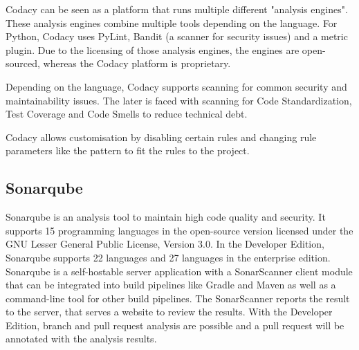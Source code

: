 Codacy can be seen as a platform that runs multiple different "analysis engines". These analysis engines combine multiple tools depending on the language. For Python, Codacy uses  PyLint, Bandit (a scanner for security issues) and a metric plugin.
Due to the licensing of those analysis engines, the engines are open-sourced, whereas the Codacy platform is proprietary.

Depending on the language, Codacy supports scanning for common security and maintainability issues. The later is faced with scanning for Code Standardization, Test Coverage and Code Smells to reduce technical debt.

Codacy allows customisation by disabling certain rules and changing rule parameters like the pattern to fit the rules to the project. 

\subsection{Sonarqube}
Sonarqube is an analysis tool to maintain high code quality and security. It supports 15 programming languages in the open-source version licensed under the GNU Lesser General Public License, Version 3.0. In the Developer Edition, Sonarqube supports 22 languages and 27 languages in the enterprise edition. Sonarqube is a self-hostable server application with a SonarScanner client module that can be integrated into build pipelines like Gradle and Maven as well as a command-line tool for other build pipelines. The SonarScanner reports the result to the server, that serves a website to review the results. With the Developer Edition, branch and pull request analysis are possible and a pull request will be annotated with the analysis results.

